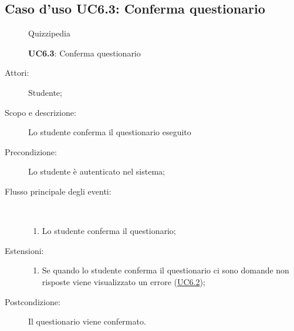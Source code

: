 \subsection{Caso d'uso UC6.3: Conferma questionario}
\begin{figure}[H]
	\centering
	\begin{resizedtikzpicture}{\textwidth}
		\begin{umlsystem}[x=0, fill=lightgray!20]{Quizzipedia}
		\end{umlsystem}
	\end{resizedtikzpicture}
	\caption{\textbf{UC6.3}: Conferma questionario}
	\label{UC6.3}
\end{figure}
\begin{description}
	\item[Attori:] Studente;
	\item[Scopo e descrizione:] Lo studente conferma il questionario eseguito
	\item[Precondizione:] Lo studente è autenticato nel sistema;
	
	\item[Flusso principale degli eventi:] \ 
	\begin{enumerate}
		\item Lo studente conferma il questionario;
		
	\end{enumerate}
	\item[Estensioni:]
	\begin{enumerate}
		\item Se quando lo studente conferma il questionario ci sono domande non risposte viene visualizzato un errore (\hyperlink{UC6.2}{UC6.2});
		
	\end{enumerate}
	\item[Postcondizione:] Il questionario viene confermato.
\end{description}
\hypertarget{UC6.4}{}
